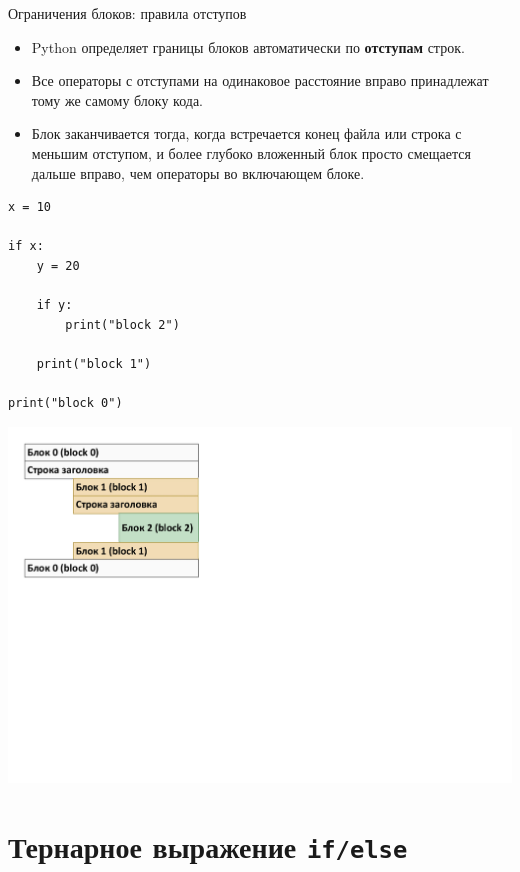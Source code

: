 \documentclass[aspectratio=169]{beamer}	%
\begin{document}
\begin{frame}[fragile]{Ограничения блоков: правила отступов}
\scriptsize
\begin{itemize}
	\item Python определяет границы блоков автоматически по \textcolor{extraorange}{\textbf{отступам}} строк.
	
	\item Все операторы с отступами на одинаковое расстояние вправо принадлежат тому же самому блоку кода.
	
	\item Блок заканчивается тогда, когда встречается конец файла или строка с меньшим отступом, и более глубоко вложенный блок просто смещается дальше вправо, чем операторы во включающем блоке.
\end{itemize}
	 
\begin{multicols}{2}

\begin{verbatim}
x = 10

if x:
    y = 20
    
    if y:
        print("block 2")
    
    print("block 1")

print("block 0")
\end{verbatim}
\columnbreak

\centering
\includegraphics[width=.38\textwidth]{pics/вложенные_блоки_кода}

\end{multicols}	 
\vfill
\end{frame}


\section{Тернарное выражение \texttt{if/else}}
\sectionframe
\end{document}
